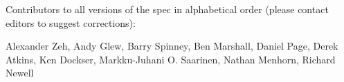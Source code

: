 
%
%

\noindent
Contributors to all versions of the spec in
alphabetical order (please contact editors to suggest
corrections):

Alexander Zeh,
Andy Glew,
Barry Spinney,
Ben Marshall,
Daniel Page,
Derek Atkins,
Ken Dockser,
Markku-Juhani O. Saarinen,
Nathan Menhorn,
Richard Newell
